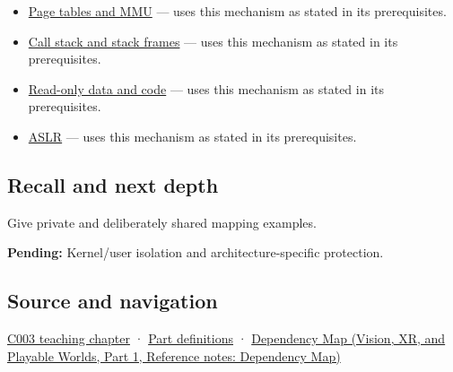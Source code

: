 \hypertarget{appendix-c2a9ad1e2b49-used-by}{}

\begin{itemize}
\tightlist
\item
  \hyperref[appendix-01e5905165c4]{Page tables and MMU} --- uses this mechanism as stated in its prerequisites.
\item
  \hyperref[appendix-b081b7abe193]{Call stack and stack frames} --- uses this mechanism as stated in its prerequisites.
\item
  \hyperref[appendix-5f9e5e2f0a5e]{Read-only data and code} --- uses this mechanism as stated in its prerequisites.
\item
  \hyperref[appendix-78cb248c8355]{ASLR} --- uses this mechanism as stated in its prerequisites.
\end{itemize}

\subsection{Recall and next depth}\label{appendix-c2a9ad1e2b49-recall-and-next-depth}

\hypertarget{appendix-c2a9ad1e2b49-recall-and-next-depth}{}

Give private and deliberately shared mapping examples.

\textbf{Pending:} Kernel/user isolation and architecture-specific protection.

\subsection{Source and navigation}\label{appendix-c2a9ad1e2b49-source-and-navigation}

\hypertarget{appendix-c2a9ad1e2b49-source-and-navigation}{}

\hyperref[01-foundations-i-ch002-where-the-bytes-live]{C003 teaching chapter} · \hyperref[appendix-fd090d982a15-m003---parts-41-60]{Part definitions} · \href{../07-Vision-XR-and-Playable-Worlds-P01/main.pdf\#appendix-4ad47bdd269a}{Dependency Map (Vision, XR, and Playable Worlds, Part 1, Reference notes: Dependency Map)}
